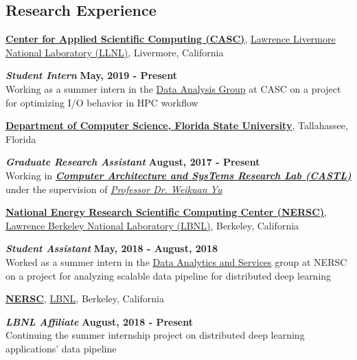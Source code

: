 \documentclass[margin,line]{res}
\begin{document}
\begin{resume}
\vspace*{-.1in}

\section{\sc Research Experience}
{\bf \href{https://computing.llnl.gov/casc}{Center for Applied Scientific Computing (CASC)}}, \href{http://www.llnl.gov/}{Lawrence Livermore National Laboratory (LLNL)}, Livermore, California

\vspace{-.4cm}
\textbf{{\em Student Intern}} \hfill {\bf May, 2019 - Present}\\
Working as a summer intern in the \href{https://computing.llnl.gov/casc/data-analysis-group}{Data Analysis Group} at CASC on a project for optimizing I/O behavior in HPC workflow

\vspace{-.2cm}

{\bf \href{http://www.cs.fsu.edu/}{Department of Computer Science, Florida State University}}, Tallahassee, Florida

\vspace{-.4cm}
\textbf{{\em Graduate Research Assistant}} \hfill {\bf August, 2017 - Present}\\
Working in \textbf{\textit{\href{http://castl.cs.fsu.edu/doku.php/}{Computer Architecture and SysTems Research Lab (CASTL)}}} under the supervision of \textit{\href{https://www.cs.fsu.edu/~yuw/}{Professor Dr. Weikuan Yu}}

\vspace{-.2cm}
{\bf \href{http://www.nersc.gov/}{National Energy Research Scientific Computing Center (NERSC)}}, \href{http://www.lbl.gov/}{Lawrence Berkeley National Laboratory (LBNL)}, Berkeley, California

\vspace{-.4cm}
\textbf{{\em Student Assistant}} \hfill {\bf May, 2018 - August, 2018}\\
Worked as a summer intern in the \href{http://www.nersc.gov/users/data-analytics/}{Data Analytics and Services} group at NERSC on a project for analyzing scalable data pipeline for distributed deep learning

\vspace{-.2cm}
{\bf \href{http://www.nersc.gov/}{NERSC}}, \href{http://www.lbl.gov/}{LBNL}, Berkeley, California

\vspace{-.4cm}
\textbf{{\em LBNL Affiliate}} \hfill {\bf August, 2018 - Present}\\
Continuing the summer internship project on distributed deep learning applications' data pipeline


\end{resume}
\end{document}
